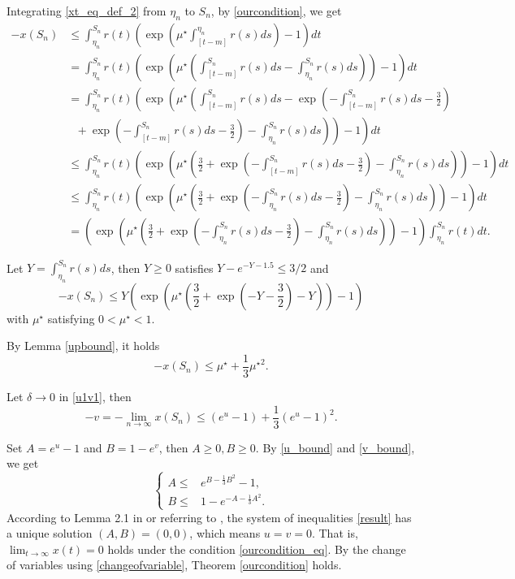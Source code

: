 \documentclass{HZNUMCM}
\begin{document}
 Integrating \eqref{xt_eq_def_2} from $\eta_n$ to $S_n$, by \eqref{ourcondition}, we get
\begin{align*}
-x(S_n)&\leqslant \int_{\eta_n}^{S_n}r(t)\left(\exp\left(\mu^\star\int_{[t-m]}^{\eta_n}r(s)ds\right)-1\right)dt\\
&= \int_{\eta_n}^{S_n}r(t)\left(\exp\left(\mu^\star\left(\int_{[t-m]}^{S_n}r(s)ds-\int_{\eta_n}^{S_n}r(s)ds\right)\right)-1\right)dt\\
&= \int_{\eta_n}^{S_n}r(t)\left(\exp\left(\mu^\star\left(\int_{[t-m]}^{S_n}r(s)ds-\exp{\left(-\int_{[t-m]}^{S_n}r(s)ds -\frac 3 2\right)}\right.\right.\right.\\
&\left.\left.\left.~~~+\exp{\left(-\int_{[t-m]}^{S_n}r(s)ds -\frac 3 2\right)}-\int_{\eta_n}^{S_n}r(s)ds\right)\right)-1\right)dt\\
&\leqslant \int_{\eta_n}^{S_n}r(t)\left(\exp\left(\mu^\star\left(\frac 3 2+\exp{\left(-\int_{[t-m]}^{S_n}r(s)ds -\frac 3 2\right)}-\int_{\eta_n}^{S_n}r(s)ds\right)\right)-1\right)dt\\
&\leqslant\int_{\eta_n}^{S_n}r(t)\left(\exp\left(\mu^\star\left(\frac 3 2+\exp{\left(-\int_{\eta_n}^{S_n}r(s)ds -\frac 3 2\right)}-\int_{\eta_n}^{S_n}r(s)ds\right)\right)-1\right)dt\\
&=\left(\exp\left(\mu^\star\left(\frac 3 2+\exp{\left(-\int_{\eta_n}^{S_n}r(s)ds -\frac 3 2\right)}-\int_{\eta_n}^{S_n}r(s)ds\right)\right)-1\right)\int_{\eta_n}^{S_n}r(t)dt.
\end{align*}

Let $Y=\int_{\eta_n}^{S_n}r(s)ds$, then $Y\geqslant 0$ satisfies $Y-e^{-Y-1.5}\leqslant 3/2$ and
$$
-x(S_n)\leqslant Y\left(\exp\left(\mu^\star\left(\frac 3 2+\exp{\left(-Y -\frac 3 2\right)}-Y\right)\right)-1\right)
$$with $\mu^\star$ satisfying $0<\mu^\star< 1$.

By Lemma \ref{upbound}, it holds
$$
-x(S_n)\leqslant \mu^\star+\frac 1 3 {\mu^\star}^2.
$$

Let $\delta\rightarrow 0$ in \eqref{u1v1}, then
\begin{equation}\label{v_bound}
-v=-\lim_{n\rightarrow\infty}x(S_n)\leqslant(e^{u}-1)+\frac 1 3(e^{u}-1)^2.
\end{equation}

Set $A=e^{u}-1$ and $B=1-e^v$, then $A\geqslant0, B\geqslant0$. By \eqref{u_bound} and \eqref{v_bound}, we get
\begin{equation}\label{result}
\left\{\begin{aligned}
A\leqslant&e^{B-\frac 1 3 B^2}-1,\\
B\leqslant&1-e^{-A-\frac 1 3 A^2}.
\end{aligned}
\right.
\end{equation}
According to Lemma 2.1 in  \cite{1995_so_MR1317052} or referring to \cite{1995_so_R1339824}, the system of inequalities \eqref{result} has a unique solution $(A,B)=(0,0)$, which means $u=v=0$. That is, $\lim_{t\rightarrow\infty}x(t)=0$ holds under the condition \eqref{ourcondition_eq}. By the change of variables using \eqref{changeofvariable}, Theorem \ref{ourcondition} holds.
\end{document}
